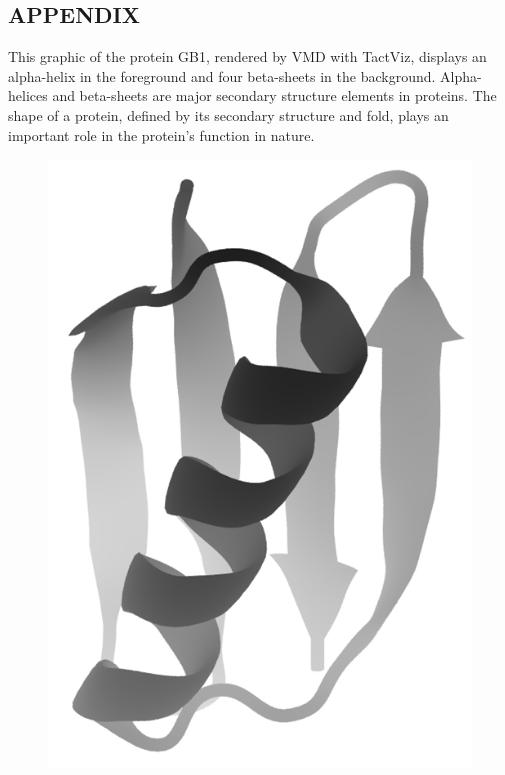\documentclass[11.5pt]{sig-alternate} %
\begin{document}
\clearpage
\noindent
\begin{large}
\leftskip 0in
\parindent 0in 

\section*{APPENDIX}
This graphic of the protein GB1, rendered by VMD with TactViz, displays an alpha-helix in the foreground and four beta-sheets in the background. Alpha-helices and beta-sheets are major secondary structure elements in proteins. The shape of a protein, defined by its secondary structure and fold, plays an important role in the protein’s function in nature.

\begin{figure}[h]
    \centering
    \includegraphics[width=1\linewidth]{fig2.png}
\end{figure}
\end{large}
\end{document}
